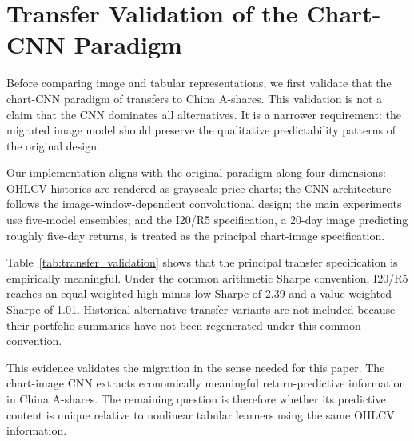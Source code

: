 \section{Transfer Validation of the Chart-CNN Paradigm}

Before comparing image and tabular representations, we first validate that the chart-CNN paradigm of \citet{jiang2023reimagining} transfers to China A-shares. This validation is not a claim that the CNN dominates all alternatives. It is a narrower requirement: the migrated image model should preserve the qualitative predictability patterns of the original design.

Our implementation aligns with the original paradigm along four dimensions: OHLCV histories are rendered as grayscale price charts; the CNN architecture follows the image-window-dependent convolutional design; the main experiments use five-model ensembles; and the I20/R5 specification, a 20-day image predicting roughly five-day returns, is treated as the principal chart-image specification.



Table~\ref{tab:transfer_validation} shows that the principal transfer specification is empirically meaningful. Under the common arithmetic Sharpe convention, I20/R5 reaches an equal-weighted high-minus-low Sharpe of 2.39 and a value-weighted Sharpe of 1.01. Historical alternative transfer variants are not included because their portfolio summaries have not been regenerated under this common convention.

This evidence validates the migration in the sense needed for this paper. The chart-image CNN extracts economically meaningful return-predictive information in China A-shares. The remaining question is therefore whether its predictive content is unique relative to nonlinear tabular learners using the same OHLCV information.
